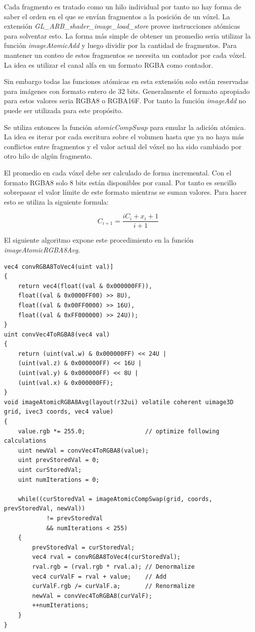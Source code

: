 Cada fragmento es tratado como un hilo individual por tanto no hay forma de saber el orden en el que se envían fragmentos a la posición de un vóxel. La extensión \emph{{GL\_ARB\_shader\_image\_load\_store}} provee instrucciones atómicas para solventar esto. La forma más simple de obtener un promedio seria utilizar la función \emph{imageAtomicAdd} y luego dividir por la cantidad de fragmentos. Para mantener un conteo de estos fragmentos se necesita un contador por cada vóxel. La idea es utilizar el canal alfa en un formato RGBA como contador. 

Sin embargo todas las funciones atómicas en esta extensión solo están reservadas para imágenes con formato entero de 32 bits. Generalmente el formato apropiado para estos valores seria RGBA8 o RGBA16F. Por tanto la función \emph{imageAdd} no puede ser utilizada para este propósito.

Se utiliza entonces la función \emph{atomicCompSwap} para emular la adición atómica. La idea es iterar por cada escritura sobre el volumen hasta que ya no haya más conflictos entre fragmentos y el valor actual del vóxel no ha sido cambiado por otro hilo de algún fragmento.

El promedio en cada vóxel debe ser calculado de forma incremental. Con el formato RGBA8 solo 8 bits están disponibles por canal. Por tanto es sencillo sobrepasar el valor límite de este formato mientras se suman valores. Para hacer esto se utiliza la siguiente formula:

\begin{equation}
	C_{i+1} = \frac{iC_{i}+x_i+1}{i+1}
\end{equation}

El siguiente algoritmo expone este procedimiento en la función \emph{imageAtomicRGBA8Avg}.
\\
\begin{lstlisting}[caption={Conversion entre RGBA8 y R32UI y promedio incremental.}, label=imageAtomicRGBA8Avg]
vec4 convRGBA8ToVec4(uint val)]
{
    return vec4(float((val & 0x000000FF)), 
    float((val & 0x0000FF00) >> 8U), 
    float((val & 0x00FF0000) >> 16U), 
    float((val & 0xFF000000) >> 24U));
}
uint convVec4ToRGBA8(vec4 val)
{
    return (uint(val.w) & 0x000000FF) << 24U | 
    (uint(val.z) & 0x000000FF) << 16U | 
    (uint(val.y) & 0x000000FF) << 8U | 
    (uint(val.x) & 0x000000FF);
}
void imageAtomicRGBA8Avg(layout(r32ui) volatile coherent uimage3D grid, ivec3 coords, vec4 value)
{
    value.rgb *= 255.0;                 // optimize following calculations
    uint newVal = convVec4ToRGBA8(value);
    uint prevStoredVal = 0;
    uint curStoredVal;
    uint numIterations = 0;

    while((curStoredVal = imageAtomicCompSwap(grid, coords, prevStoredVal, newVal)) 
            != prevStoredVal
            && numIterations < 255)
    {
        prevStoredVal = curStoredVal;
        vec4 rval = convRGBA8ToVec4(curStoredVal);
        rval.rgb = (rval.rgb * rval.a); // Denormalize
        vec4 curValF = rval + value;    // Add
        curValF.rgb /= curValF.a;       // Renormalize
        newVal = convVec4ToRGBA8(curValF);
        ++numIterations;
    }
}
\end{lstlisting}

